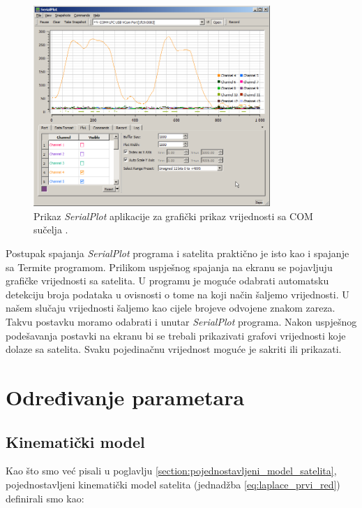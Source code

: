 \documentclass[times, utf8, diplomski, numeric]{templates/template}
\begin{document}
{{        \begin{figure}[htb]
        \centering
        \includegraphics[width=0.8\textwidth]{images/serialplot.png}
        \caption{Prikaz \emph{SerialPlot} aplikacije za grafički prikaz vrijednosti sa COM sučelja \cite{serialplot}.}
        \label{fig:serialplot}
        \end{figure}

        Postupak spajanja \emph{SerialPlot} programa i satelita praktično je isto kao i spajanje sa Termite programom. Prilikom uspješnog spajanja na ekranu se pojavljuju grafičke vrijednosti sa satelita. U programu je moguće odabrati automatsku detekciju broja podataka u ovisnosti o tome na koji način šaljemo vrijednosti. U našem slučaju vrijednosti šaljemo kao cijele brojeve odvojene znakom zareza. Takvu postavku moramo odabrati i unutar \emph{SerialPlot} programa. Nakon uspješnog podešavanja postavki na ekranu bi se trebali prikazivati grafovi vrijednosti koje dolaze sa satelita. Svaku pojedinačnu vrijednost moguće je sakriti ili prikazati. 
    }

    \section{Određivanje parametara}{
        \subsection{Kinematički model}{
        \label{subsection:kinematicki_model}
            Kao što smo već pisali u poglavlju \ref{section:pojednostavljeni_model_satelita}, pojednostavljeni kinematički model satelita (jednadžba \ref{eq:laplace_prvi_red}) definirali smo kao:

}}}
\end{document}
